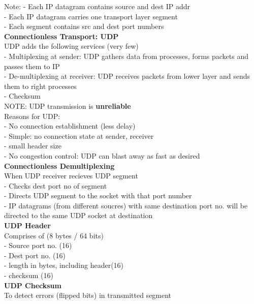 \documentclass[10pt, a4paper]{article}
\newcommand{\highlight}[1]{{\color{red}\textbf{#1}}}
\newcommand{\blue}[1]{{\color{MidnightBlue}#1}}
\newcommand{\red}[1]{{\color{red}#1}}
\begin{document}
\begin{multicols*}{3}
		Note:
		- Each IP datagram contains \blue{source and dest IP addr}\\
		- Each IP datagram carries \blue{one transport layer segment}\\
		- Each segment contains \blue{src and dest port numbers}\\

		\textbf{Connectionless Transport: UDP}\\
		UDP adds the following services (very few)\\
		- \blue{Multiplexing} at sender: UDP gathers data from processes, forms packets and passes them to IP\\
		- \blue{De-multiplexing} at receiver: UDP receives packets from lower layer and sends them to right processes\\
		- \blue{Checksum}\\
		\red{NOTE}: UDP transmission is \highlight{unreliable}\\
		Reasons for UDP:\\
		- No connection establishment (less delay)\\
		- Simple: no connection state at sender, receiver\\
		- small header size\\
		- No congestion control: UDP can blast away as fast as desired\\

		\textbf{Connectionless Demultiplexing}\\
		When UDP \red{receiver} recieves UDP segment\\
		- Checks \blue{dest port no} of segment\\
		- Directs UDP segment to the socket with that port number\\
		- IP datagrams (from different soucres) with \blue{same destination port no.} will be directed to the same UDP socket at destination\\

		\textbf{UDP Header}\\
		Comprises of (8 bytes / 64 bits)\\
		- Source port no. (16)\\
		- Dest port no. (16)\\
		- length \red{in bytes, including header}(16)\\
		- checksum (16)\\

		\textbf{UDP Checksum}\\
		To detect errors (flipped bits) in transmitted segment\\


\end{multicols*}
\end{document}
